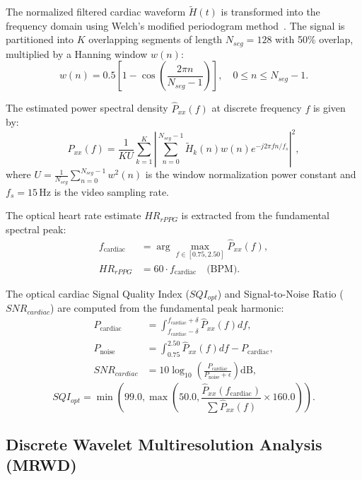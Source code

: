 \documentclass[journal]{IEEEtran}
\begin{document}
The normalized filtered cardiac waveform $\tilde{H}(t)$ is transformed into the frequency domain using Welch's modified periodogram method~\cite{ref17}. The signal is partitioned into $K$ overlapping segments of length $N_{seg}=128$ with 50\% overlap, multiplied by a Hanning window $w(n)$:
\begin{equation}
    w(n) = 0.5 \left[ 1 - \cos\left( \frac{2\pi n}{N_{seg} - 1} \right) \right], \quad 0 \le n \le N_{seg}-1.
\end{equation}

The estimated power spectral density $\hat{P}_{xx}(f)$ at discrete frequency $f$ is given by:
\begin{equation}
    \hat{P}_{xx}(f) = \frac{1}{K U} \sum_{k=1}^K \left| \sum_{n=0}^{N_{seg}-1} \tilde{H}_k(n) w(n) e^{-j 2\pi f n / f_s} \right|^2,
    \label{eq:welch}
\end{equation}
where $U = \frac{1}{N_{seg}} \sum_{n=0}^{N_{seg}-1} w^2(n)$ is the window normalization power constant and $f_s = 15$\,Hz is the video sampling rate.

The optical heart rate estimate $HR_{rPPG}$ is extracted from the fundamental spectral peak:
\begin{align}
    f_{\text{cardiac}} &= \arg\max_{f \in [0.75, 2.50]} \hat{P}_{xx}(f), \label{eq:f_peak} \\
    HR_{rPPG} &= 60 \cdot f_{\text{cardiac}} \quad \text{(BPM)}.
\end{align}

The optical cardiac Signal Quality Index ($SQI_{opt}$) and Signal-to-Noise Ratio ($SNR_{cardiac}$) are computed from the fundamental peak harmonic:
\begin{align}
    P_{\text{cardiac}} &= \int_{f_{\text{cardiac}}-\delta}^{f_{\text{cardiac}}+\delta} \hat{P}_{xx}(f) df, \\
    P_{\text{noise}} &= \int_{0.75}^{2.50} \hat{P}_{xx}(f) df - P_{\text{cardiac}}, \\
    SNR_{cardiac} &= 10 \log_{10} \left( \frac{P_{\text{cardiac}}}{P_{\text{noise}} + \epsilon} \right) \text{dB},
    \label{eq:snr}
\end{align}
\begin{equation}
    SQI_{opt} = \min\left(99.0, \max\left(50.0, \frac{\hat{P}_{xx}(f_{\text{cardiac}})}{\sum \hat{P}_{xx}(f)} \times 160.0 \right)\right).
    \label{eq:sqi}
\end{equation}

\subsection{Discrete Wavelet Multiresolution Analysis (MRWD)}
\end{document}
